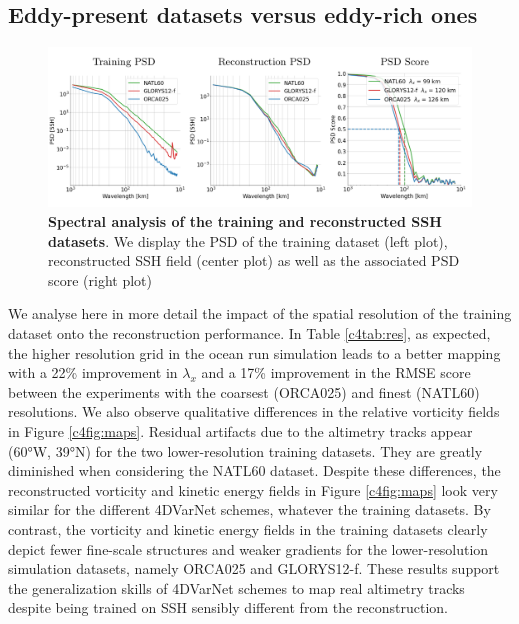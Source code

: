 \begin{bibunit}
\subsection*{Eddy-present datasets versus eddy-rich ones}
\label{c4ssec:resolution}


\begin{figure}[H]
\small
\includegraphics[width=\linewidth]{./00_Simulearning/standalone_figures/psd_res.png}
\caption{
\textbf{Spectral analysis of the training and reconstructed SSH datasets}. We display the PSD of the training dataset (left plot), reconstructed SSH field (center plot) as well as the associated PSD score (right plot)}\vspace{-5mm}
\label{c4fig:respsd}
\end{figure}


We analyse here in more detail the impact of the spatial resolution of the training dataset onto the reconstruction performance. In Table \ref{c4tab:res}, as expected, the higher resolution grid in the ocean run simulation leads to a better mapping with a 22\% improvement in $\lambda_x$  and a 17\% improvement in the RMSE score between the experiments with the coarsest (ORCA025) and finest (NATL60) resolutions.
We also observe qualitative differences in the relative vorticity fields in Figure \ref{c4fig:maps}.  Residual artifacts due to the altimetry tracks appear (60°W, 39°N) for the two lower-resolution training datasets. They are greatly diminished when considering the NATL60 dataset. 
Despite these differences, the reconstructed vorticity and kinetic energy fields in Figure \ref{c4fig:maps} look very similar for the different 4DVarNet schemes, whatever the training datasets. By contrast, the vorticity and kinetic energy fields in the training datasets clearly depict fewer fine-scale structures and weaker gradients for the lower-resolution simulation datasets, namely ORCA025 and GLORYS12-f.
These results support the generalization skills of 4DVarNet schemes to map real altimetry tracks despite being trained on SSH sensibly different from the reconstruction. 


\end{bibunit}
